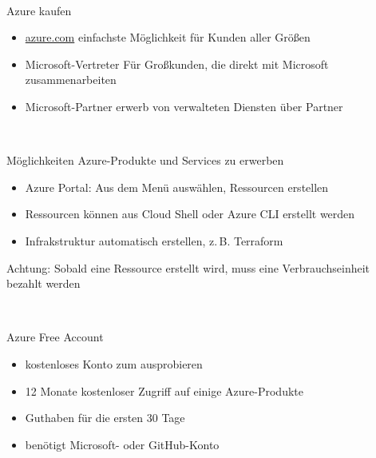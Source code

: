 \documentclass{scrartcl}
\newenvironment{flashcard}[2][]{%
    #1
    \vfill
    \centerline{\Large{#2}}
    \vfill
\newpage
}
{\newpage}
\begin{document}
    \begin{flashcard}[\ ]{Azure kaufen}
        \begin{itemize}
            \item \href{azure.com}{azure.com}\newline
            einfachste Möglichkeit für Kunden aller Größen
            \item Microsoft-Vertreter\newline
            Für Großkunden, die direkt mit Microsoft zusammenarbeiten
            \item Microsoft-Partner\newline
            erwerb von verwalteten Diensten über Partner
        \end{itemize}
    \end{flashcard}

    \begin{flashcard}[\ ]{Möglichkeiten Azure-Produkte und Services zu erwerben}
        \begin{itemize}
            \item Azure Portal: Aus dem Menü auswählen, Ressourcen erstellen
            \item Ressourcen können aus Cloud Shell oder Azure CLI erstellt werden
            \item Infrakstruktur automatisch erstellen, z.\,B. Terraform
        \end{itemize}

        \vspace{5mm}
        Achtung: Sobald eine Ressource erstellt wird, muss eine Verbrauchseinheit bezahlt werden
    \end{flashcard}

    \begin{flashcard}[\ ]{Azure Free Account}
        \begin{itemize}
            \item kostenloses Konto zum ausprobieren
            \item 12 Monate kostenloser Zugriff auf einige Azure-Produkte
            \item Guthaben für die ersten 30 Tage
            \item benötigt Microsoft- oder GitHub-Konto
        \end{itemize}

    \end{flashcard}
\end{document}
